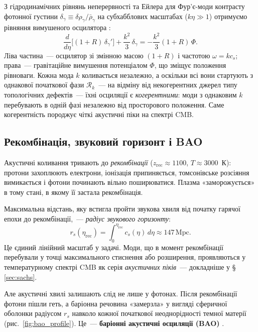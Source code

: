 \documentclass[12pt, a4paper]{article}
\begin{document}
З гідродинамічних рівнянь неперервності та Ейлера для
Фур'є-моди контрасту фотонної густини
$\delta_\gamma \equiv \delta\rho_\gamma/\bar{\rho}_\gamma$
на субхабблових масштабах ($k\eta \gg 1$) отримуємо
рівняння вимушеного осцилятора \cite{dodelson_2020}:
\begin{equation}\label{eq:acoustic_oscillator}
  \frac{d}{d\eta}\bigl[(1+R)\,\delta_\gamma'\bigr]
  + \frac{k^2}{3}\,\delta_\gamma
  = -\frac{k^2}{3}(1+R)\,\Phi.
\end{equation}
Ліва частина~--- осцилятор зі змінною масою $(1+R)$
і частотою $\omega = kc_s$; права~--- гравітаційне
вимушення потенціалом $\Phi$, що зміщує положення
рівноваги. Кожна мода $k$ коливається незалежно, а
оскільки всі вони стартують з однакової початкової фази
$\mathcal{R}_k$~--- на відміну від некогерентних джерел
типу топологічних дефектів~--- їхні осциляції є
\emph{когерентними}: моди з однаковим $k$ перебувають
в одній фазі незалежно від просторового положення.
Саме когерентність породжує чіткі акустичні піки
на спектрі CMB.

\subsection{Рекомбінація, звуковий горизонт і BAO}

Акустичні коливання тривають до \emph{рекомбінації}
($z_\mathrm{rec} \approx 1100$, $T \approx 3000$~К):
протони захоплюють електрони, іонізація припиняється,
томсонівське розсіяння вимикається і фотони починають
вільно поширюватися. Плазма «заморожується» в тому стані,
в якому її застала рекомбінація.

Максимальна відстань, яку встигла пройти звукова хвиля
від початку гарячої епохи до рекомбінації,~---
\emph{радіус звукового горизонту}:
\begin{equation}\label{eq:sound_horizon}
  r_s(\eta_\mathrm{rec})
    = \int_0^{\eta_\mathrm{rec}} c_s(\eta)\,d\eta
    \approx 147\,\mathrm{Mpc}.
\end{equation}
Це єдиний лінійний масштаб у задачі. Моди, що в момент
рекомбінації перебували у точці максимального стиснення
або розширення, проявляються у температурному спектрі
CMB як серія \emph{акустичних піків}~--- докладніше
у §\,\ref{sec:sachs}.

Але акустичні хвилі залишають слід не лише у фотонах.
Після рекомбінації фотони пішли геть, а баріонна речовина
«замерзла» у вигляді сферичної оболонки радіусом $r_s$
навколо кожної початкової неоднорідності темної матерії
(рис.~\ref{fig:bao_profile}). Це~--- \textbf{баріонні
акустичні осциляції (BAO)} \cite{eisenstein_2005}.
\end{document}
